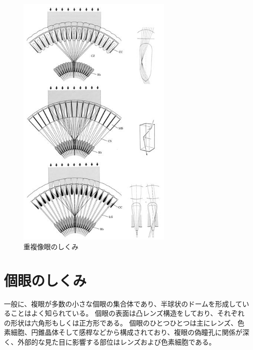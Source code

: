 \begin{figure}[hn]
  \centering
  \includegraphics[width=3.0in]{./img/tyoufukuzougan.jpg}
  \caption{重複像眼のしくみ}
  \label{FTyoufuku}
\end{figure}


\section{個眼のしくみ}

一般に、複眼が多数の小さな個眼の集合体であり、半球状のドームを形成していることはよく知られている。
個眼の表面は凸レンズ構造をしており、それぞれの形状は六角形もしくは正方形である\figref{}。
個眼のひとつひとつは主にレンズ、色素細胞、円錐晶体そして感桿などから構成されており、複眼の偽瞳孔に関係が深く、外部的な見た目に影響する部位はレンズおよび色素細胞である。



